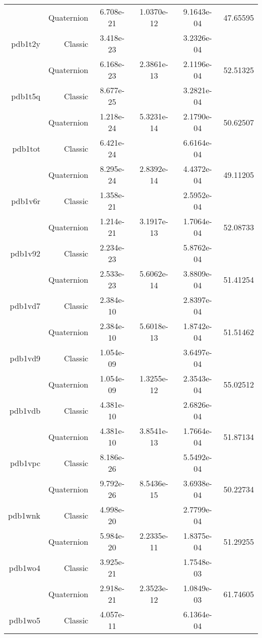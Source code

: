 \begin{xltabular}{\textwidth}{r|rS[table-format=1.3e+2]S[table-format=1.4e+2]S[table-format=1.4e+2]S[table-format=-1.5]}
& Quaternion & 6.708e-21 & 1.0370e-12 & 9.1643e-04 & 47.65595\\  \addlinespace
pdb1t2y & Classic & 3.418e-23 &  & 3.2326e-04 & \\
& Quaternion & 6.168e-23 & 2.3861e-13 & 2.1196e-04 & 52.51325\\  \addlinespace
pdb1t5q & Classic & 8.677e-25 &  & 3.2821e-04 & \\
& Quaternion & 1.218e-24 & 5.3231e-14 & 2.1790e-04 & 50.62507\\  \addlinespace
pdb1tot & Classic & 6.421e-24 &  & 6.6164e-04 & \\
& Quaternion & 8.295e-24 & 2.8392e-14 & 4.4372e-04 & 49.11205\\  \addlinespace
pdb1v6r & Classic & 1.358e-21 &  & 2.5952e-04 & \\
& Quaternion & 1.214e-21 & 3.1917e-13 & 1.7064e-04 & 52.08733\\  \addlinespace
pdb1v92 & Classic & 2.234e-23 &  & 5.8762e-04 & \\
& Quaternion & 2.533e-23 & 5.6062e-14 & 3.8809e-04 & 51.41254\\  \addlinespace
pdb1vd7 & Classic & 2.384e-10 &  & 2.8397e-04 & \\
& Quaternion & 2.384e-10 & 5.6018e-13 & 1.8742e-04 & 51.51462\\  \addlinespace
pdb1vd9 & Classic & 1.054e-09 &  & 3.6497e-04 & \\
& Quaternion & 1.054e-09 & 1.3255e-12 & 2.3543e-04 & 55.02512\\  \addlinespace
pdb1vdb & Classic & 4.381e-10 &  & 2.6826e-04 & \\
& Quaternion & 4.381e-10 & 3.8541e-13 & 1.7664e-04 & 51.87134\\  \addlinespace
pdb1vpc & Classic & 8.186e-26 &  & 5.5492e-04 & \\
& Quaternion & 9.792e-26 & 8.5436e-15 & 3.6938e-04 & 50.22734\\  \addlinespace
pdb1wnk & Classic & 4.998e-20 &  & 2.7799e-04 & \\
& Quaternion & 5.984e-20 & 2.2335e-11 & 1.8375e-04 & 51.29255\\  \addlinespace
pdb1wo4 & Classic & 3.925e-21 &  & 1.7548e-03 & \\
& Quaternion & 2.918e-21 & 2.3523e-12 & 1.0849e-03 & 61.74605\\  \addlinespace
pdb1wo5 & Classic & 4.057e-11 &  & 6.1364e-04 & \\

\end{xltabular}
